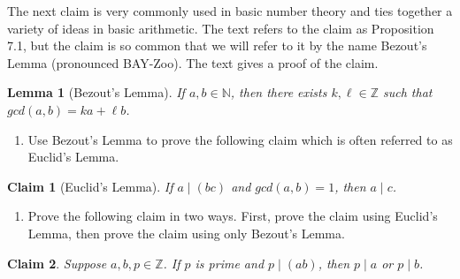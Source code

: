 \documentclass[12 pt]{article}
\newcommand{\Z}{\mathbb{Z}}
\newcommand{\N}{\mathbb{N}}
\newcommand{\divides}{\! \mid \!}
\theoremstyle{definition}
\theoremstyle{plain}
\theoremstyle{mytheorem}
\theoremstyle{myexample}
\newtheorem{claim}{Claim}
\newtheorem*{lemma*}{Lemma}
\theoremstyle{mydefinition}
\begin{document}
\noindent The next claim is very commonly used in basic number theory and ties together a variety of ideas in basic arithmetic.  The text refers to the claim as Proposition 7.1, but the claim is so common that we will refer to it by the name Bezout's Lemma (pronounced BAY-Zoo).  The text gives a proof of the claim.

\begin{lemma*}[Bezout's Lemma]  If $a,b \in \N$, then there exists $k, \ell \in \Z$ such that $gcd(a,b)=ka+\ell b$.
\end{lemma*}

\begin{enumerate}[resume]
\item Use Bezout's Lemma to prove the following claim which is often referred to as Euclid's Lemma.
\end{enumerate}

\begin{claim}[Euclid's Lemma]  If $a \divides (bc)$ and $gcd(a,b)=1$, then $a \divides c$.
\end{claim}

\vspace{3in}

\begin{enumerate}[resume]
\item Prove the following claim in two ways.  First, prove the claim using Euclid's Lemma, then prove the claim using only Bezout's Lemma.
\end{enumerate}

\begin{claim}  Suppose $a,b,p \in \Z$.  If $p$ is prime and $p \divides (ab)$, then $p \divides a$ or $p \divides b$.
\end{claim}
\end{document}
